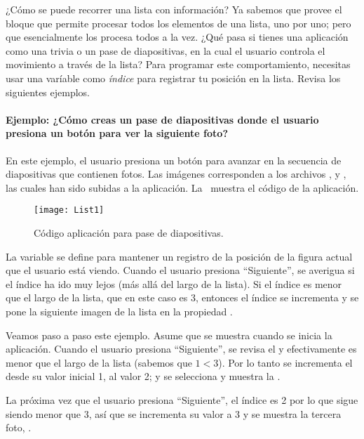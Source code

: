 ¿Cómo se puede recorrer una lista con información? Ya sabemos que
\AppInventor provee el bloque  que permite
procesar todos los elementos de una lista, uno por uno; pero que
esencialmente los procesa todos a la vez. ¿Qué pasa si tienes una
aplicación como una trivia o un pase de diapositivas, en la cual el
usuario controla el movimiento a través de la lista? Para programar
este comportamiento, necesitas usar una varíable como \emph{índice}
para registrar tu posición en la lista. Revisa los siguientes
ejemplos.

\paragraph{Ejemplo: ¿Cómo creas un pase de diapositivas donde el
  usuario presiona un botón para ver la siguiente foto?}

En este ejemplo, el usuario presiona un botón para avanzar en la
secuencia de diapositivas que contienen fotos. Las imágenes
corresponden a los archivos ,
 y , las cuales han sido
subidas a la aplicación. La~ muestra el código de la
aplicación.

\begin{figure}[H]
  \centering
  \texttt{[image: List1]}  
  \caption{Código aplicación para pase de diapositivas.}
  \label{fig:List1}
\end{figure}

La variable  se define para mantener un registro de
la posición de la figura actual que el usuario está viendo. Cuando el
usuario presiona ``Siguiente'', se averigua si el índice ha ido muy
lejos (más allá del largo de la lista). Si el índice es menor que el
largo de la lista, que en este caso es 3, entonces el índice se
incrementa y se pone la siguiente imagen de la lista en la propiedad
.

Veamos paso a paso este ejemplo. Asume que  se
muestra cuando se inicia la aplicación. Cuando el usuario presiona
``Siguiente'', se revisa el  y efectivamente es menor
que el largo de la lista (sabemos que $1 < 3$). Por lo tanto se
incrementa el  desde su valor inicial 1, al valor 2;
y se selecciona y muestra la .

La próxima vez que el usuario presiona ``Siguiente'', el índice es 2
por lo que sigue siendo menor que 3, así que se incrementa su valor a
3 y se muestra la tercera foto, .

